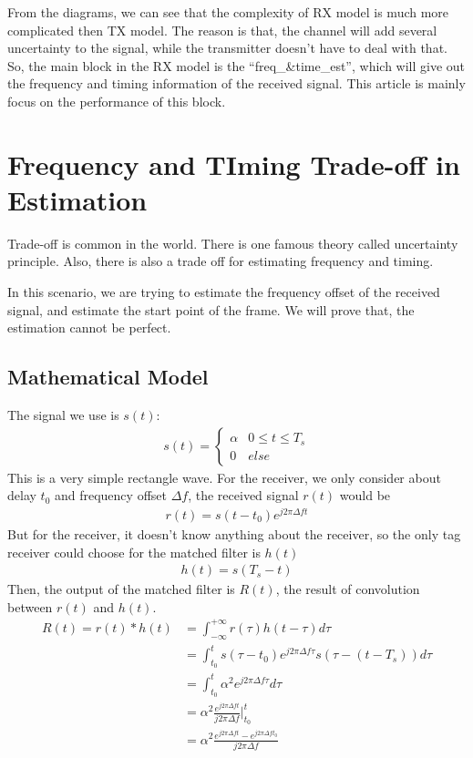 \documentclass[a4paper]{report}
\begin{document}
From the diagrams, we can see that the complexity of RX model is much more complicated then TX model. The reason is that, the channel will add several uncertainty to the signal, while the transmitter doesn't have to deal with that. So, the main block in the RX model is the ``freq\_\&time\_est'', which will give out the frequency and timing information of the received signal. This article is mainly focus on the performance of this block. 

\section{Frequency and TIming Trade-off in Estimation}

Trade-off is common in the world. There is one famous theory called uncertainty principle\cite{Uncertainty_Principle}. Also, there is also a trade off for estimating frequency and timing.

In this scenario, we are trying to estimate the frequency offset of the received signal, and estimate the start point of the frame. We will prove that, the estimation cannot be perfect.

\subsection{Mathematical Model} %
\label{sub:mathematical_model}
The signal we use is $s(t)$:
\begin{align}
	s(t) = 
	\begin{cases}
		\alpha & 0 \leq t \leq T_s\\
		0 	   & else
	\end{cases}
\end{align}
This is a very simple rectangle wave.
For the receiver, we only consider about delay $t_0$ and frequency offset $\Delta f$, the received signal $r(t)$ would be
\begin{align}
	r(t) = s(t - t_0) e^{j 2 \pi \Delta f t}
\end{align}
But for the receiver, it doesn't know anything about the receiver, so the only tag receiver could choose for the matched filter is $h(t)$
\begin{align}
	h(t) = s(T_s - t)
\end{align}
Then, the output of the matched filter is $R(t)$, the result of convolution between $r(t)$ and $h(t)$. 
\begin{align}
	R(t) = r(t) \ast h(t) 
	&= \int_{-\infty}^{+\infty} r(\tau) h(t - \tau) d\tau\\
	&= \int_{t_0}^t s(\tau - t_0)e^{j 2 \pi \Delta f \tau} s(\tau - (t - T_s)) d \tau\\
	&= \int_{t_0}^t \alpha^2 e^{j 2 \pi \Delta f \tau} d \tau\\
	&= \alpha^2 \frac{e^{j 2 \pi \Delta f t}}{j 2\pi \Delta f} \bigg|_{t_0}^t\\
	&= \alpha^2 \frac{e^{j 2\pi \Delta f t} - e^{j 2\pi \Delta f t_0}}{j 2\pi \Delta f}
\end{align}
\end{document}
